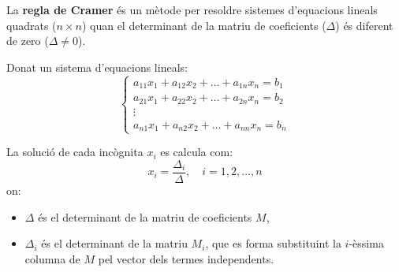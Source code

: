 \documentclass[12pt]{article}
\begin{document}
\begin{concept}
La \textbf{regla de Cramer} és un mètode per resoldre sistemes d'equacions lineals quadrats (\(n \times n\)) quan el determinant de la matriu de coeficients (\(\Delta\)) és diferent de zero (\(\Delta \neq 0\)).

Donat un sistema d'equacions lineals:
\[
\begin{cases}
a_{11}x_1 + a_{12}x_2 + \dots + a_{1n}x_n = b_1 \\
a_{21}x_1 + a_{22}x_2 + \dots + a_{2n}x_n = b_2 \\
\vdots \\
a_{n1}x_1 + a_{n2}x_2 + \dots + a_{nn}x_n = b_n
\end{cases}
\]

La solució de cada incògnita \(x_i\) es calcula com:
\[
x_i = \frac{\Delta_i}{\Delta}, \quad i = 1, 2, \dots, n
\]
on:
\begin{itemize}
    \item \(\Delta\) és el determinant de la matriu de coeficients \(M\),
    \item \(\Delta_i\) és el determinant de la matriu \(M_i\), que es forma substituint la \(i\)-èssima columna de \(M\) pel vector dels termes independents.
\end{itemize}
\end{concept}
\end{document}
